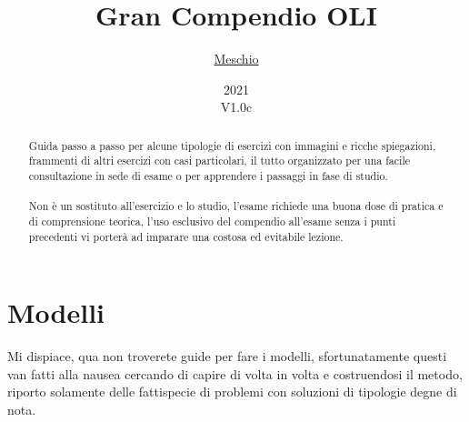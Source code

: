 \documentclass{article}
\title{Gran Compendio OLI}
\author{\href{https://github.com/meschio94/Gran-Compendio-OLI}{Meschio}}
\date{2021\\V1.0c}
\begin{document}
\maketitle

\begin{abstract}
Guida passo a passo per alcune tipologie di esercizi con immagini e ricche spiegazioni, frammenti di altri esercizi con casi particolari, il tutto organizzato per una facile consultazione in sede di esame o per apprendere i passaggi in fase di studio.\\
\\
Non è un sostituto all'esercizio e lo studio, l'esame richiede una buona dose di pratica e di comprensione teorica, l'uso esclusivo del compendio all'esame senza i punti precedenti vi porterà ad imparare una costosa ed evitabile lezione.
\end{abstract}

\tableofcontents

\section{Modelli}
Mi dispiace, qua non troverete guide per fare i modelli, sfortunatamente questi van fatti alla nausea cercando di capire di volta in volta e costruendosi il metodo, riporto solamente delle fattispecie di problemi con soluzioni di tipologie degne di nota.
\end{document}
